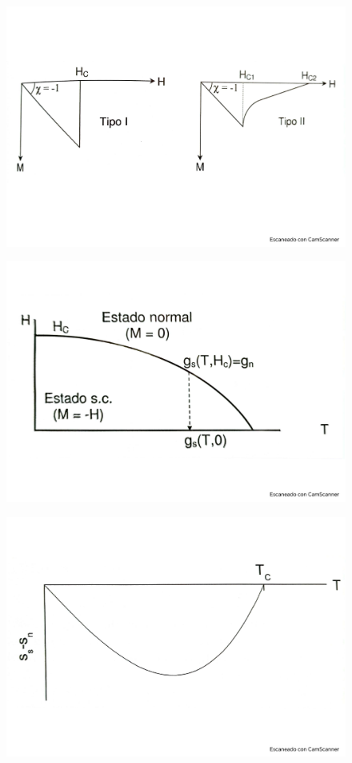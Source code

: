 \begin{figure}[h!] \centering
	\includegraphics[scale=0.5]{Cuerpo/Ch_11/Fotos libro 5.pdf}
	\caption{}
	\label{Fig:11-05}
\end{figure}
\begin{figure}[h!] \centering
	\includegraphics[scale=0.5]{Cuerpo/Ch_11/Fotos libro 6.pdf}
	\caption{}
	\label{Fig:11-06}
\end{figure}
\begin{figure}[h!] \centering
	\includegraphics[scale=0.5]{Cuerpo/Ch_11/Fotos libro 7.pdf}
	\caption{}
	\label{Fig:11-07}
\end{figure}
